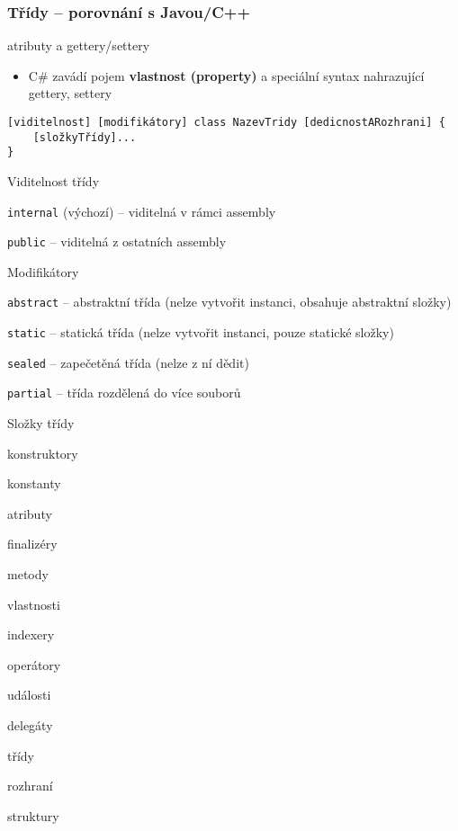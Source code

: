 \begin{frame}[fragile]
\frametitle{Třídy -- porovnání s Javou/C++}
\begin{bitemize}{}
\item atributy a gettery/settery
\begin{itemize}
\item C\# zavádí pojem \textbf{vlastnost (property)} a speciální syntax nahrazující gettery, settery
\end{itemize}
\end{bitemize}
\end{frame}






\begin{frame}[fragile]
\begin{noteblock}{}
\begin{lstlisting}
[viditelnost] [modifikátory] class NazevTridy [dedicnostARozhrani] { 
	[složkyTřídy]...
}
\end{lstlisting}
\end{noteblock}
\vskip -3mm
\begin{bitemize}{Viditelnost třídy}
\item \lstinline|internal| (výchozí) -- viditelná v rámci assembly
\item \lstinline|public| -- viditelná z ostatních assembly
\end{bitemize}
\vskip -3mm
\begin{bitemize}{Modifikátory}
\item \lstinline|abstract| -- abstraktní třída (nelze vytvořit instanci, obsahuje abstraktní složky)
\item \lstinline|static| -- statická třída (nelze vytvořit instanci, pouze statické složky)
\item \lstinline|sealed| -- zapečetěná třída (nelze z ní dědit)
\item \lstinline|partial| -- třída rozdělená do více souborů
\end{bitemize}
\end{frame}




\begin{frame}[fragile]
\begin{bitemize}{Složky třídy}
\item konstruktory
\item konstanty
\item atributy
\item finalizéry
\item metody
\item vlastnosti
\item indexery
\item operátory
\item události
\item delegáty
\item třídy
\item rozhraní
\item struktury
\end{bitemize}
\end{frame}




